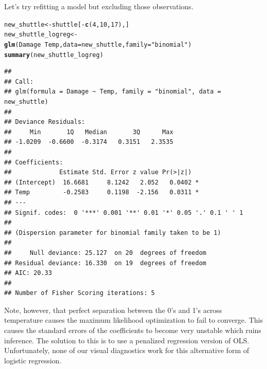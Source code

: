\documentclass{article}\usepackage[]{graphicx}\usepackage[]{color}
\makeatletter
\newcommand{\hlnum}[1]{\textcolor[rgb]{0.686,0.059,0.569}{#1}}%
\newcommand{\hlstr}[1]{\textcolor[rgb]{0.192,0.494,0.8}{#1}}%
\newcommand{\hlopt}[1]{\textcolor[rgb]{0,0,0}{#1}}%
\newcommand{\hlstd}[1]{\textcolor[rgb]{0.345,0.345,0.345}{#1}}%
\newcommand{\hlkwb}[1]{\textcolor[rgb]{0.69,0.353,0.396}{#1}}%
\newcommand{\hlkwc}[1]{\textcolor[rgb]{0.333,0.667,0.333}{#1}}%
\newcommand{\hlkwd}[1]{\textcolor[rgb]{0.737,0.353,0.396}{\textbf{#1}}}%
\newenvironment{kframe}{%
 \def\at@end@of@kframe{}%
 \ifinner\ifhmode%
  \def\at@end@of@kframe{\end{minipage}}%
  \begin{minipage}{\columnwidth}%
 \fi\fi%
 \def\FrameCommand##1{\hskip\@totalleftmargin \hskip-\fboxsep
 \colorbox{shadecolor}{##1}\hskip-\fboxsep
     \hskip-\linewidth \hskip-\@totalleftmargin \hskip\columnwidth}%
 \MakeFramed {\advance\hsize-\width
   \@totalleftmargin\z@ \linewidth\hsize
   \@setminipage}}%
 {\par\unskip\endMakeFramed%
 \at@end@of@kframe}
\newenvironment{knitrout}{}{} %
\makeatother
\begin{document}
Let's try refitting a model but excluding those observations.

\begin{knitrout}
\color{fgcolor}\begin{kframe}
\begin{alltt}
\hlstd{new_shuttle} \hlkwb{<-} \hlstd{shuttle[}\hlopt{-}\hlkwd{c}\hlstd{(}\hlnum{4}\hlstd{,} \hlnum{10}\hlstd{,} \hlnum{17}\hlstd{), ]}
\hlstd{new_shuttle_logreg} \hlkwb{<-} \hlkwd{glm}\hlstd{(Damage} \hlopt{~} \hlstd{Temp,} \hlkwc{data} \hlstd{= new_shuttle,} \hlkwc{family} \hlstd{=} \hlstr{"binomial"}\hlstd{)}
\hlkwd{summary}\hlstd{(new_shuttle_logreg)}
\end{alltt}
\begin{verbatim}
## 
## Call:
## glm(formula = Damage ~ Temp, family = "binomial", data = new_shuttle)
## 
## Deviance Residuals: 
##     Min       1Q   Median       3Q      Max  
## -1.0209  -0.6600  -0.3174   0.3151   2.3535  
## 
## Coefficients:
##             Estimate Std. Error z value Pr(>|z|)  
## (Intercept)  16.6681     8.1242   2.052   0.0402 *
## Temp         -0.2583     0.1198  -2.156   0.0311 *
## ---
## Signif. codes:  0 '***' 0.001 '**' 0.01 '*' 0.05 '.' 0.1 ' ' 1
## 
## (Dispersion parameter for binomial family taken to be 1)
## 
##     Null deviance: 25.127  on 20  degrees of freedom
## Residual deviance: 16.330  on 19  degrees of freedom
## AIC: 20.33
## 
## Number of Fisher Scoring iterations: 5
\end{verbatim}
\end{kframe}
\end{knitrout}

Note, however, that perfect separation between the 0's and 1's across temperature causes the maximum likelihood optimization to fail to converge. This causes the standard errors of the coefficients to become very unstable which ruins inference. The solution to this is to use a penalized regression version of OLS. Unfortunately, none of our visual diagnostics work for this alternative form of logistic regression. 
\end{document}
